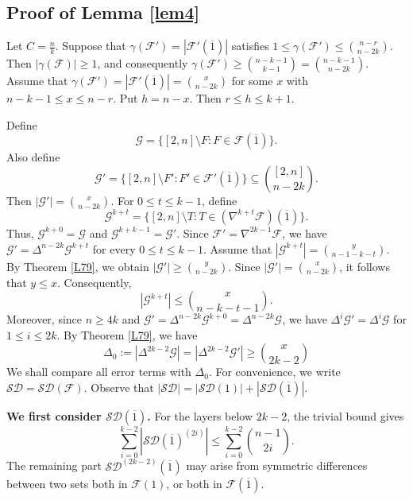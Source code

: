 \documentclass[11pt]{article}
\numberwithin{equation}{section}
\begin{document}
\subsection{Proof of Lemma \ref{lem4}}

Let $C = \frac{n}{k}$. Suppose that $\gamma(\mathcal{F}') = |\mathcal{F}'(\overline{1})|$ satisfies
$
1 \le \gamma(\mathcal{F}') \le \binom{n - r}{n - 2k}.
$
Then $|\gamma(\mathcal{F})|\ge 1$, and consequently
$\gamma(\mathcal{F}')\ge\binom{n-k-1}{k-1}=\binom{n-k-1}{n-2k}$.
Assume that $\gamma({\mathcal{F}'})=|\mathcal{F}'(\overline1)|=\binom{x}{n-2k}$ for some $x$ with $n-k-1\le x\le n-r.$
Put
$
h=n-x.
$
Then
$
r\le h\le k+1. 
$




 

Define
$$
\mathcal{G} = \{[2,n] \setminus F : F \in \mathcal{F}(\overline{1})\}.
$$
Also define
$$
\mathcal{G}' = \{[2,n] \setminus F' : F' \in \mathcal{F}'(\overline{1})\} \subseteq \binom{[2,n]}{n-2k}.
$$
Then
$
|\mathcal{G}'|=\binom{x}{n-2k}.
$
For  $0\le t\le k-1$, define
 $$\mathcal{G}^{k+t}=\{[2, n] \setminus T : T \in (\nabla^{k+t}\mathcal{F})(\overline{1})\}.$$ 
Thus,  $\mathcal{G}^{k+0}=\mathcal{G}$ and $\mathcal{G}^{k+k-1}=\mathcal{G}'$.
 Since $\mathcal{F}'=\nabla^{2k-1}\mathcal{F}$, we have $\mathcal{G}'=\Delta^{n-2k}{\mathcal{G}^{k+t}}$ for every $0 \leq t\leq k-1$.
      Assume that $|\mathcal{G}^{k+t}|=\binom{y}{n-1-k-t}$. By Theorem \ref{L79}, we obtain $|\mathcal{G}'|\geq \binom{y}{n-2k}$.
      Since $|\mathcal{G}'|=\binom{x}{n-2k} $, it follows that $y\leq x$.
Consequently,  $$|\mathcal{G}^{k+t}|\le \binom{x}{n-k-t-1}.$$ 
Moreover, since  $n\ge 4k$ and $\mathcal{G}'=\Delta^{n-2k}{\mathcal{G}^{k+0}}=\Delta^{n-2k}{\mathcal{G}}$,  we have $\Delta^i{\mathcal{G}'}=\Delta^i{\mathcal{G}}$ for $1\le i \le 2k$.
By Theorem \ref{L79}, we have
  $$\Delta_0:=|\Delta^{2k-2}{\mathcal{G}}|=|\Delta^{2k-2}{\mathcal{G}'}|\geq\binom{x}{2k-2}$$
We shall compare all error terms with $\Delta_0$.
 For convenience, we write $\mathcal{SD}=\mathcal{SD(F)}$.
	Observe that $|\mathcal{SD}|=|\mathcal{SD}(1)|+|\mathcal{SD}(\overline{1})|$.

\textbf{ We first consider $\mathcal{SD}(\overline{1})$.}
For the layers below $2k-2$, the trivial bound gives
$$
\sum_{i=0}^{k-2}|\mathcal{SD}(\overline{1})^{(2i)}|
\le \sum_{i=0}^{k-2}\binom{n-1}{2i}. 
$$
The remaining part $\mathcal{SD}^{(2k-2)}(\overline{1})$ may arise from symmetric differences between two sets both in $\mathcal{F}(1)$, or both in $\mathcal{F}(\overline{1})$.
\end{document}

